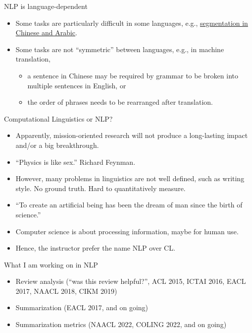 \documentclass[11pt,handout]{beamer}
\begin{document}
\begin{frame}{NLP is language-dependent}
 \begin{itemize}[<+->]
  \item Some tasks are particularly difficult in some languages, e.g., \href{https://nlp.stanford.edu/software/segmenter.shtml}{segmentation in Chinese and Arabic}. 
  \item Some tasks are not ``symmetric'' between languages, e.g., in machine translation, 
  \begin{itemize}
   \item a sentence in Chinese may be required by grammar to be broken into multiple sentences in English, or 
   \item the order of phrases needs to be rearranged after translation. 
  \end{itemize}
 \end{itemize}
\end{frame}

\begin{frame}{Computational Linguistics or NLP? }
\begin{itemize}
\item Apparently, mission-oriented research will not produce a long-lasting impact and/or a big breakthrough. 
\item ``Physics is like sex.'' Richard Feynman. 
\item  However, many problems in linguistics are not well defined, such as writing style. No ground truth. Hard to quantitatively measure. 
\item ``To create an artificial being has been the dream of man since the birth of science.'' 
\item Computer science is about processing information, maybe for human use. 
\item Hence, the instructor prefer the name NLP over CL. 
\end{itemize}

\end{frame}

\begin{frame}{What I am working on in NLP}
\begin{itemize}[<+->]
\item Review analysis  (``was this review helpful?'', ACL 2015, ICTAI 2016, EACL 2017, NAACL 2018, CIKM 2019)
\item Summarization (EACL 2017, and on going)
\item Summarization metrics (NAACL 2022, COLING 2022, and on going)
\end{itemize}
\end{frame}
\end{document}
